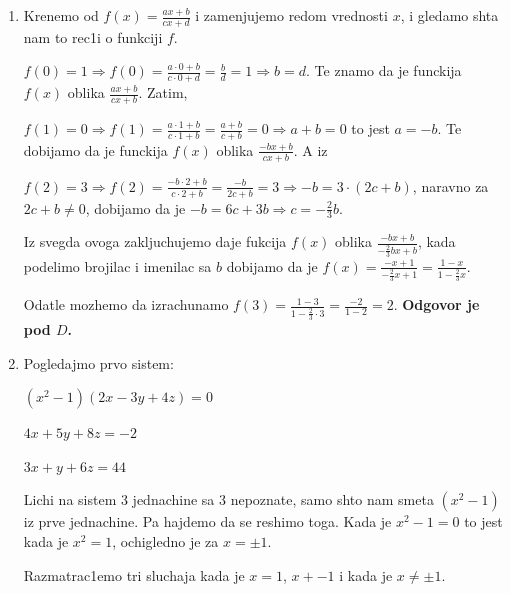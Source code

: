 \documentclass[a4paper,12pt]{article}
\begin{document}
\begin{enumerate}[1.]
\item Krenemo od $f(x) = \frac{ax +b}{cx+d} $ i zamenjujemo redom vrednosti $x$, i gledamo shta nam to rec1i o funkciji $f$.
\par $f(0) = 1 \Longrightarrow f(0) = \frac{a \cdot 0 + b}{c \cdot 0 + d} = \frac{b}{d} = 1  \Longrightarrow  b = d$. Te znamo da je funckija $f(x)$ oblika $\frac{ax+b}{cx+b}$. Zatim,
\par $f(1) = 0 \Longrightarrow f(1) = \frac{a \cdot 1 + b}{c \cdot 1 + b} = \frac{a+b}{c+b} = 0  \Longrightarrow  a+b = 0$ to jest $a = -b$. Te dobijamo da je funckija $f(x)$ oblika $\frac{-bx+b}{cx+b}$. A iz
\par $f(2) = 3 \Longrightarrow f(2) = \frac{-b \cdot 2 + b}{c \cdot 2 + b} = \frac{-b}{2c+b} = 3  \Longrightarrow  -b = 3 \cdot (2c+b)$, naravno za $2c+b \neq 0$, dobijamo da je $-b = 6c +3b \Longrightarrow c = - \frac{2}{3} b$.
\par Iz svegda ovoga zakljuchujemo daje fukcija $f(x)$ oblika $\frac{-bx + b}{- \frac{2}{3} b x + b} $, kada podelimo brojilac i imenilac sa $b$ dobijamo da je $f(x) =\frac{-x + 1}{- \frac{2}{3} x + 1} =\frac{1-x}{1- \frac{2}{3} x }  $.
\par Odatle mozhemo da izrachunamo $f(3) =\frac{1-3}{1- \frac{2}{3} \cdot 3 } = \frac{-2}{1-2} = 2 $. \textbf{Odgovor je pod $D$.}


\item Pogledajmo prvo sistem:
\begin{center}
\par $(x^{2} - 1)(2x -3y + 4z) = 0$
\par $4x + 5y +8z = -2$
\par $3x + y + 6z = 44$
\end{center}

\par Lichi na sistem 3 jednachine sa 3 nepoznate, samo shto nam smeta $(x^{2} - 1)$  iz prve jednachine. Pa hajdemo da se reshimo toga. Kada je $x^{2} - 1 = 0$ to jest kada je $x^{2} =1$, ochigledno je za $x = \pm 1$.
\par Razmatrac1emo tri sluchaja kada je $x = 1$, $x+ -1$ i kada je $x \neq \pm 1$.
\begin{enumerate}[1)]


\end{enumerate}
\end{enumerate}
\end{document}
